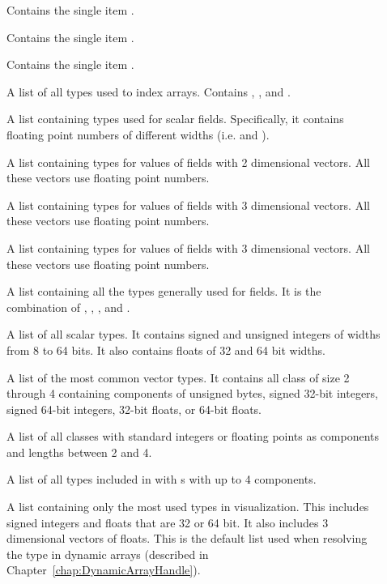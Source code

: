 \begin{description}
\item[] Contains the single item .
\item[] Contains the single item .
\item[] Contains the single item .
\item[] A list of all types used to index
  arrays. Contains , , and .
\item[] A list containing types used for
  scalar fields. Specifically, it contains floating point numbers of
  different widths (i.e.  and ).
\item[] A list containing types for values of
  fields with 2 dimensional vectors. All these vectors use floating point
  numbers.
\item[] A list containing types for values of
  fields with 3 dimensional vectors. All these vectors use floating point
  numbers.
\item[] A list containing types for values of
  fields with 3 dimensional vectors. All these vectors use floating point
  numbers.
\item[] A list containing all the types generally
  used for fields. It is the combination of ,
  , , and
  .
\item[] A list of all scalar types. It contains
  signed and unsigned integers of widths from 8 to 64 bits. It also
  contains floats of 32 and 64 bit widths.
\item[] A list of the most common vector
  types. It contains all  class of size 2 through 4 containing
  components of unsigned bytes, signed 32-bit integers, signed 64-bit
  integers, 32-bit floats, or 64-bit floats.
\item[] A list of all  classes with
  standard integers or floating points as components and lengths between 2
  and 4.
\item[] A list of all types included in
   with s with up to 4 components.
\item[] A list containing only the most used types
  in visualization. This includes signed integers and floats that are 32 or
  64 bit. It also includes 3 dimensional vectors of floats. This is the
  default list used when resolving the type in dynamic arrays (described in
  Chapter~\ref{chap:DynamicArrayHandle}).
\end{description}

